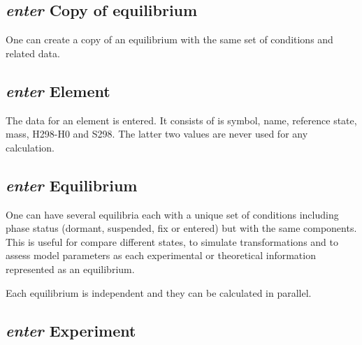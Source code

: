\documentclass[12pt]{article}
\begin{document}
\subsection{{\em enter} Copy of equilibrium}

One can create a copy of an equilibrium with the same set of
conditions and related data.

\subsection{{\em enter} Element}

The data for an element is entered.  It consists of is symbol, name,
reference state, mass, H298-H0 and S298.  The latter two values are 
never used for any calculation.

\subsection{{\em enter} Equilibrium}

One can have several equilibria each with a unique set of conditions
including phase status (dormant, suspended, fix or entered) but with
the same components.  This is useful for compare different states, to
simulate transformations and to assess model parameters as each
experimental or theoretical information represented as an equilibrium.

Each equilibrium is independent and they can be calculated in
parallel.

\subsection{{\em enter} Experiment}
\end{document}

